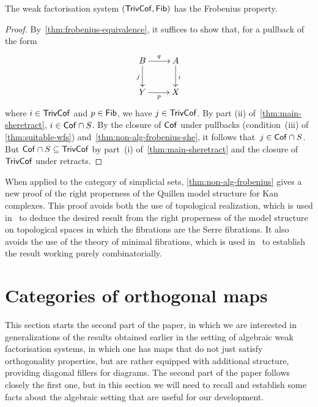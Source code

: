 \documentclass[reqno,10pt,a4paper,oneside,draft]{amsart}
\begin{document}
{{\begin{theorem} \label{thm:non-alg-frobenius}
The weak factorisation system $(\mathsf{TrivCof}, \mathsf{Fib})$ has the Frobenius property. 
\end{theorem}

\begin{proof} By~\cref{thm:frobenius-equivalence}, it suffices to show that, for a pullback of the form
\begin{equation*}
\begin{gathered}
\xymatrix{
 B \ar[d]_j \ar[r]^q & A \ar[d]^i \\ 
Y \ar[r]_p & X }
\end{gathered}
\end{equation*}
where $i  \in \mathsf{TrivCof}$ and  $p \in \mathsf{Fib}$, we have $j \in \mathsf{TrivCof}$. 
By part (ii) of~\cref{thm:main-sheretract}, $i \in \mathsf{Cof} \cap S$. By the closure of $\mathsf{Cof}$ under pullbacks (condition~(iii) of \cref{thm:suitable-wfs}) and~\cref{thm:non-alg-frobenius-she},
it follows that~$j \in \mathsf{Cof} \cap S$. But $\mathsf{Cof} \cap S \subseteq \mathsf{TrivCof}$ by part~(i) of~\cref{thm:main-sheretract} and 
the closure of $\mathsf{TrivCof}$ under retracts.
\end{proof}


\begin{remark} 
When applied to the category of simplicial sets, \cref{thm:non-alg-frobenius} gives a new proof of the right properness of the Quillen model structure for Kan complexes. This proof avoids both the use of topological realization, which is used in~\cite[Theorem~13.1.13]{hirschhorn-model-localizations} to deduce the desired result from the right properness of the model structure on topological spaces in which the fibrations are the Serre fibrations. It also avoids the use of the theory of minimal fibrations, which is used in~\cite[Theorem~1.7.1]{joyal-tierney-notes} to establish the result working purely combinatorially.
\end{remark} 





\section{Categories of orthogonal maps}
\label{sec:ortf}

This section starts the second part of the paper, in which we are interested in generalizations of the results obtained earlier in the setting
of algebraic weak factorisation systems, in which one has maps that do not just satisfy orthogonality properties, but are rather equipped
with additional structure, providing diagonal fillers for diagrams. The second part of the paper follows closely the first one, but in this section
we will need to recall and establish some facts about the algebraic setting that are useful for our development. 

}}
\end{document}
